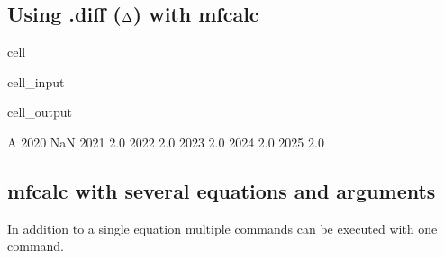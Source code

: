 \documentclass[letterpaper,10pt,english]{jupyterBook}
\begin{document}
\subsection{Using .diff (\protect\(\Delta\protect\)) with mfcalc}
\label{\detokenize{content/howto/update/extending_dataframes:using-diff-delta-with-mfcalc}}
\begin{sphinxuseclass}{cell}\begin{sphinxVerbatimInput}

\begin{sphinxuseclass}{cell_input}
\begin{sphinxVerbatim}[commandchars=\\\{\}]
   
                      
\end{sphinxVerbatim}

\end{sphinxuseclass}\end{sphinxVerbatimInput}
\begin{sphinxVerbatimOutput}

\begin{sphinxuseclass}{cell_output}
\begin{sphinxVerbatim}[commandchars=\\\{\}]
        A
2020  NaN
2021  2.0
2022  2.0
2023  2.0
2024  2.0
2025  2.0
\end{sphinxVerbatim}

\end{sphinxuseclass}\end{sphinxVerbatimOutput}

\end{sphinxuseclass}

\subsection{mfcalc with several equations and arguments}
\label{\detokenize{content/howto/update/extending_dataframes:mfcalc-with-several-equations-and-arguments}}
\sphinxAtStartPar
In addition to a single equation multiple commands can be executed with one command.
\end{document}
